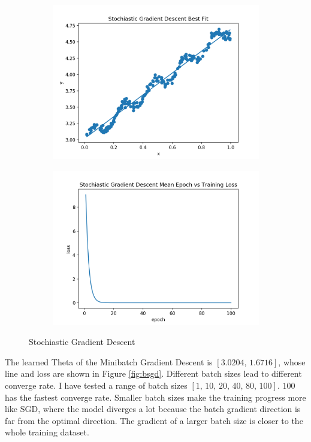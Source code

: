 \documentclass[11pt]{article}
\begin{document}
\begin{enumerate}
\begin{figure}[!h]
    \centering
    \begin{subfigure}[b]{0.4\linewidth}
      \includegraphics[width=\linewidth]{figures/sgd.png}
    \end{subfigure}
    \begin{subfigure}[b]{0.4\linewidth}
      \includegraphics[width=\linewidth]{figures/sgd_loss.png}
    \end{subfigure}
    \caption{Stochiastic Gradient Descent}
    \label{fig:sgd}
\end{figure}

The learned Theta of the Minibatch Gradient Descent is $[3.0204,\, 1.6716]$, whose line and loss are shown in Figure \ref{fig:bsgd}. Different batch sizes lead to different converge rate. I have tested a range of batch sizes $[1,\, 10,\, 20,\, 40,\, 80,\, 100]$. $100$ has the fastest converge rate. Smaller batch sizes make the training progress more like SGD, where the model diverges a lot because the batch gradient direction is far from the optimal direction. The gradient of a larger batch size is closer to the whole training dataset.
\medskip


\end{enumerate}
\end{document}
